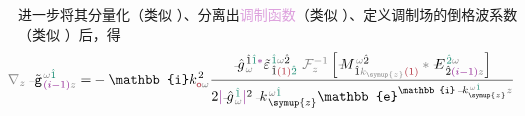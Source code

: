 进一步将其分量化（类似 ）、分离出\textcolor{Plum}{调制函数}（类似 ）、定义\textcolor{NavyBlue}{调制场}的\textcolor{NavyBlue}{倒格波系数}（类似 ）后，得
\begin{subequations}
\begin{align}
	\hspace{-1.2em} \mathcolor{gray}{\nabla_z} \xint{\begin{smallmatrix} ~ \\ {}^{}_{\mathcolor{gray}{-}} \\ ~ \end{smallmatrix}}{09}{\tilde{\mathtt{g}}}^{\;\!\mathcolor{gray}{\omega} \textcolor{PineGreen}{\hat{1}}}_{\;\! \textcolor{Plum}{(i-1)} \mathcolor{gray}{z}} = & - \mathbb{i} k_{\textcolor{Maroon}{\mathsf{o}} \mathcolor{gray}{\omega}}^{\;\! 2} \frac{ \xint{{}^{}_{\mathcolor{gray}{-}}}{10}{\hat{g}}^{\;\! \hat{1} \textcolor{PineGreen}{\hat{1}} \textcolor{Plum}{*}}_{\;\! \mathcolor{gray}{\omega}} {\tilde{\varepsilon}}^{\;\! \textcolor{PineGreen}{\hat{1}} \mathcolor{gray}{\omega} \hat{2} }_{\;\! \hat{1} \textcolor{Maroon}{(1)} \textcolor{PineGreen}{\hat{2}}} ~ \mathcolor{gray}{\mathcal F_{z}^{-1}} \left[ \xint{\mathcolor{gray}{-}}{18}{M}^{\;\! \mathcolor{gray}{\omega} \hat{2} }_{\;\! \hat{1} \mathcolor{gray}{k_{\symup{z}}} \textcolor{Maroon}{(1)} } \mathcolor{gray}{*} \xint{\mathcolor{gray}{-}}{25}{E}^{\;\! \textcolor{PineGreen}{\hat{2}} \mathcolor{gray}{\omega} }_{\;\! \hat{2} \textcolor{Plum}{(i-1)} \mathcolor{gray}{z} } \right] }{ 2 \textcolor{Plum}{\lvert} \xint{{}^{}_{\mathcolor{gray}{-}}}{10}{\hat{g}}^{\;\! \textcolor{PineGreen}{\hat{1}}}_{\;\! \mathcolor{gray}{\omega}} \textcolor{Plum}{\rvert}^2 \xint{\begin{smallmatrix} ~ \\ {}^{}_{\mathcolor{gray}{-}} \\ ~ \end{smallmatrix}}{15}{k}_{\;\! \symup{z}}^{\;\! \mathcolor{gray}{\omega} \textcolor{PineGreen}{\hat{1}}} \mathbb{e}^{\mathbb{i} \xint{\begin{smallmatrix} ~ \\ {}^{}_{\mathcolor{gray}{-}} \\ ~ \end{smallmatrix}}{15}{k}_{\symup{z}}^{\;\! \mathcolor{gray}{\omega} \textcolor{PineGreen}{\hat{1}}} \mathcolor{gray}{z}}} \label{eq:Born_approx-scalar-g-E-12-spectrum} \\

\end{align}
\end{subequations}
